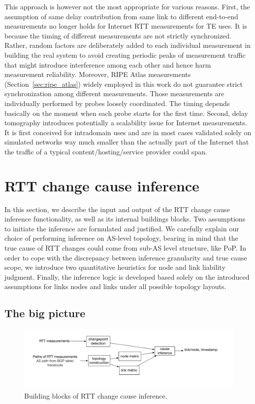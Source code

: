 This approach is however not the most appropriate for various reasons. First, the assumption of
same delay contribution from same link to different end-to-end measurements no longer holds for Internet RTT measurements for TE uses. It is because the timing of different measurements are not strictly synchronized. Rather, random factors are deliberately added to each individual measurement in building the real system to avoid creating periodic peaks of measurement traffic that might introduce interference among each other and hence harm measurement reliability. Moreover,  RIPE Atlas measurements (Section~\ref{sec:ripe_atlas}) widely employed in this work do not guarantee strict synchronization among different measurements.
Those measurements are individually performed by probes loosely coordinated. The timing depends basically on the moment when each probe starts for the first time.
Second, delay tomography introduces potentially a scalability issue for Internet measurements.
It is first conceived for intradomain uses and are in most cases validated solely on simulated networks way much smaller than the actually part of the Internet that the traffic of a typical content/hosting/service provider could span.

\section{RTT change cause inference}
\label{sec:inference}
In this section, we describe the input and output of the RTT change cause inference functionality, as well as its internal buildings blocks. 
Two assumptions to initiate the inference are formulated and justified.
We carefully explain our choice of performing inference on AS-level topology, bearing in mind that the true cause of RTT changes could come from sub-AS level structure, like \ac{PoP}.
In order to cope with the discrepancy between inference granularity and true cause scope, we introduce two quantitative heuristics for node and link liability judgment.
Finally, the inference logic is developed based solely on the introduced assumptions for links nodes and links under all possible topology layouts.

\subsection{The big picture}

\begin{figure}[!htb]
\centering
\includegraphics[width=1.2\textwidth]{gfx/chap5/sys_design.pdf}
\caption{Building blocks of RTT change cause inference.}
\label{fig:chap5_sys_design}
\end{figure}

